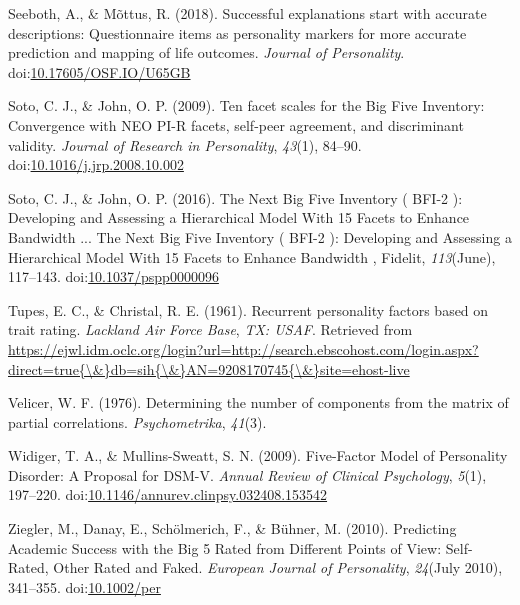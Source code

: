 \documentclass[man]{apa6}
\theoremstyle{definition}
\theoremstyle{definition}
\theoremstyle{definition}
\theoremstyle{remark}
\begin{document}
\leavevmode\hypertarget{ref-Seeboth2018}{}%
Seeboth, A., \& Mõttus, R. (2018). Successful explanations start with
accurate descriptions: Questionnaire items as personality markers for
more accurate prediction and mapping of life outcomes. \emph{Journal of
Personality}.
doi:\href{https://doi.org/10.17605/OSF.IO/U65GB}{10.17605/OSF.IO/U65GB}

\leavevmode\hypertarget{ref-SotoJohn2009}{}%
Soto, C. J., \& John, O. P. (2009). Ten facet scales for the Big Five
Inventory: Convergence with NEO PI-R facets, self-peer agreement, and
discriminant validity. \emph{Journal of Research in Personality},
\emph{43}(1), 84--90.
doi:\href{https://doi.org/10.1016/j.jrp.2008.10.002}{10.1016/j.jrp.2008.10.002}

\leavevmode\hypertarget{ref-SotoJohn2016}{}%
Soto, C. J., \& John, O. P. (2016). The Next Big Five Inventory ( BFI-2
): Developing and Assessing a Hierarchical Model With 15 Facets to
Enhance Bandwidth ... The Next Big Five Inventory ( BFI-2 ): Developing
and Assessing a Hierarchical Model With 15 Facets to Enhance Bandwidth ,
Fidelit, \emph{113}(June), 117--143.
doi:\href{https://doi.org/10.1037/pspp0000096}{10.1037/pspp0000096}

\leavevmode\hypertarget{ref-TupesChristal1961}{}%
Tupes, E. C., \& Christal, R. E. (1961). Recurrent personality factors
based on trait rating. \emph{Lackland Air Force Base}, \emph{TX: USAF}.
Retrieved from
\href{https://ejwl.idm.oclc.org/login?url=http://search.ebscohost.com/login.aspx?direct=true\%7B/\&\%7Ddb=sih\%7B/\&\%7DAN=9208170745\%7B/\&\%7Dsite=ehost-live}{https://ejwl.idm.oclc.org/login?url=http://search.ebscohost.com/login.aspx?direct=true\{\textbackslash{}\&\}db=sih\{\textbackslash{}\&\}AN=9208170745\{\textbackslash{}\&\}site=ehost-live}

\leavevmode\hypertarget{ref-Velicer1976}{}%
Velicer, W. F. (1976). Determining the number of components from the
matrix of partial correlations. \emph{Psychometrika}, \emph{41}(3).

\leavevmode\hypertarget{ref-WidigerMullins2009}{}%
Widiger, T. A., \& Mullins-Sweatt, S. N. (2009). Five-Factor Model of
Personality Disorder: A Proposal for DSM-V. \emph{Annual Review of
Clinical Psychology}, \emph{5}(1), 197--220.
doi:\href{https://doi.org/10.1146/annurev.clinpsy.032408.153542}{10.1146/annurev.clinpsy.032408.153542}

\leavevmode\hypertarget{ref-Ziegler2010}{}%
Ziegler, M., Danay, E., Schölmerich, F., \& Bühner, M. (2010).
Predicting Academic Success with the Big 5 Rated from Different Points
of View: Self-Rated, Other Rated and Faked. \emph{European Journal of
Personality}, \emph{24}(July 2010), 341--355.
doi:\href{https://doi.org/10.1002/per}{10.1002/per}

\endgroup


\clearpage
\renewcommand{\listtablename}{Table captions}
\listoftables
\end{document}
